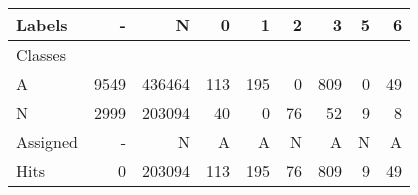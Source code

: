 \begin{tabular}{l|r|r|r|r|r|r|r|r}

Labels &     - &       N &    0 &    1 &   2 &    3 &  5 &   6 \\\hline
Classes  &       &         &      &      &     &      &    &     \\\hline
\hline
A        &  9549 &  436464 &  113 &  195 &   0 &  809 &  0 &  49 \\\hline
N        &  2999 &  203094 &   40 &    0 &  76 &   52 &  9 &   8 \\\hline
\hline
Assigned &     - &       N &    A &    A &   N &    A &  N &   A \\\hline
Hits     &     0 &  203094 &  113 &  195 &  76 &  809 &  9 &  49 
\end{tabular}
